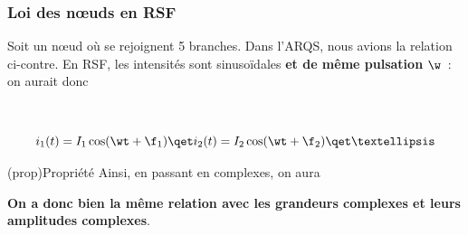 \documentclass[../../main/main.tex]{subfiles}
\begin{document}
\subsubsection{Loi des nœuds en RSF}
\noindent
\begin{minipage}[t]{.48\linewidth}
	Soit un nœud où se rejoignent 5 branches. Dans l'ARQS, nous avions
	la relation ci-contre. En RSF, les intensités sont sinusoïdales \textbf{et
		de même pulsation} $\w$~: on aurait donc
\end{minipage}
\hfill
\begin{minipage}[t]{.48\linewidth}
	~
	\vspace{-50pt}
	\begin{center}
	\end{center}
\end{minipage}
\[
	i_1(t) = I_1\cos(\wt+\f_1)
	\qet
	i_2(t) = I_2\cos(\wt+\f_2)
	\qet
	…
\]

\begin{tcb}(prop){Propriété}
	Ainsi, en passant en complexes, on aura
	\begin{center}
		\textbf{On a donc bien la même relation avec les grandeurs complexes et
			leurs amplitudes complexes}.
	\end{center}
\end{tcb}
\end{document}
